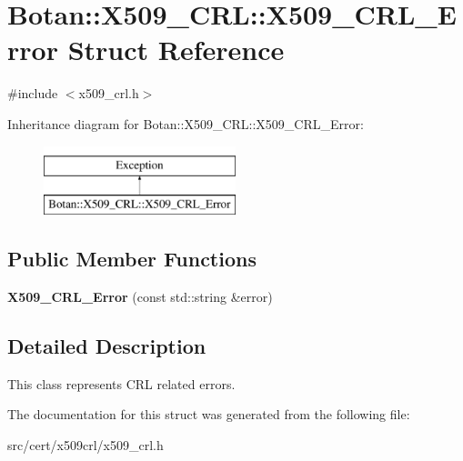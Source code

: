 \hypertarget{structBotan_1_1X509__CRL_1_1X509__CRL__Error}{\section{Botan\-:\-:X509\-\_\-\-C\-R\-L\-:\-:X509\-\_\-\-C\-R\-L\-\_\-\-Error Struct Reference}
\label{structBotan_1_1X509__CRL_1_1X509__CRL__Error}
}


{\ttfamily \#include $<$x509\-\_\-crl.\-h$>$}

Inheritance diagram for Botan\-:\-:X509\-\_\-\-C\-R\-L\-:\-:X509\-\_\-\-C\-R\-L\-\_\-\-Error\-:\begin{figure}[H]
\begin{center}
\leavevmode
\includegraphics[height=2.000000cm]{structBotan_1_1X509__CRL_1_1X509__CRL__Error}
\end{center}
\end{figure}
\subsection*{Public Member Functions}
\begin{DoxyCompactItemize}
\item 
\hypertarget{structBotan_1_1X509__CRL_1_1X509__CRL__Error_a8b08f133a41b8f98ca33aba172ca472c}{{\bfseries X509\-\_\-\-C\-R\-L\-\_\-\-Error} (const std\-::string \&error)}\label{structBotan_1_1X509__CRL_1_1X509__CRL__Error_a8b08f133a41b8f98ca33aba172ca472c}

\end{DoxyCompactItemize}


\subsection{Detailed Description}
This class represents C\-R\-L related errors. 

The documentation for this struct was generated from the following file\-:\begin{DoxyCompactItemize}
\item 
src/cert/x509crl/x509\-\_\-crl.\-h\end{DoxyCompactItemize}
